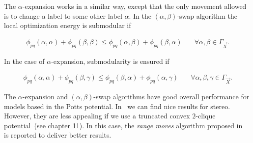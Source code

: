 The $\alpha$-expansion works in a similar way, except that the only movement allowed is to change a label to some other label $\alpha$. In the $(\alpha,\beta)$-swap algorithm the local optimization energy is submodular if

\begin{align}
	\phi_{pq}(\alpha,\alpha) + \phi_{pq}(\beta,\beta) \leq \phi_{pq}(\alpha,\beta) + \phi_{pq}(\beta,\alpha) & \quad \forall \alpha,\beta \in \Gamma_{\vec{X}}.
	\label{ch2:eq:multilabeling-metric}
\end{align}

In the case of $\alpha$-expansion, submodularity is ensured if

\begin{align}
	\phi_{pq}(\alpha,\alpha) + \phi_{pq}(\beta,\gamma) \leq \phi_{pq}(\beta,\alpha) + \phi_{pq}(\alpha,\gamma) & \quad \forall \alpha,\beta,\gamma \in \Gamma_{\vec{X}}.
	\label{ch2:eq:multilabeling-semi-metric}	
\end{align}

The $\alpha$-expansion and $(\alpha,\beta)$-swap algorithms have good overall performance for models based in the Potts potential. In~\cite{boykov01fast} we can find nice results for stereo. However, they are less appealing if we use a truncated convex $2$-clique potential~\cite{blake11markov}(see chapter 11). In this case, the \emph{range moves} algorithm proposed in~\cite{veksler07graph} is reported to deliver better results.



%
%
%
%



